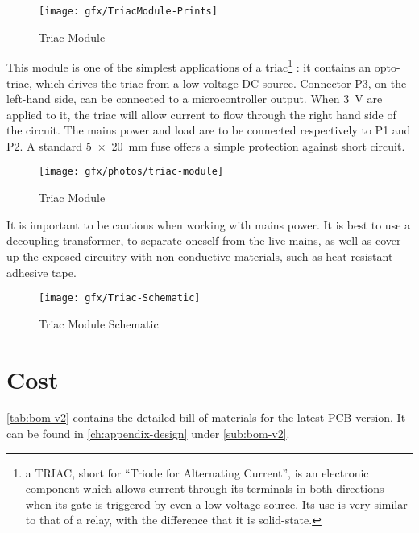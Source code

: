 \begin{figure}[htb]
  \begin{center}
    \texttt{[image: gfx/TriacModule-Prints]}
  \end{center}
  \caption{Triac Module}
  \label{fig:triac-module}
\end{figure}

This module is one of the simplest applications of a triac\footnote{a TRIAC,
short for ``Triode for Alternating Current'', is an electronic component which
allows current through its terminals in both directions when its gate is
triggered by even a low-voltage source. Its use is very similar to that of
a relay, with the difference that it is solid-state.}
: it contains an opto-triac, which drives the triac from a low-voltage DC
source. Connector P3, on the left-hand side, can be connected to
a microcontroller output. When \SI{3}{V} are applied to it, the triac will allow
current to flow through the right hand side of the circuit. The mains power and
load are to be connected respectively to P1 and P2. A standard \SI{5x20}{mm}
fuse offers a simple protection against short circuit.

\begin{figure}[htb]
  \begin{center}
    \texttt{[image: gfx/photos/triac-module]}
  \end{center}
  \caption{Triac Module}
  \label{fig:triac-module-photo}
\end{figure}

It is important to be cautious when working with mains power. It is best to use
a decoupling transformer, to separate oneself from the live mains, as well as
cover up the exposed circuitry with non-conductive materials, such as
heat-resistant adhesive tape.

\begin{figure}[htb]
  \begin{center}
    \texttt{[image: gfx/Triac-Schematic]}
  \end{center}
  \caption{Triac Module Schematic}
  \label{fig:triac-schematic}
\end{figure}

\section{Cost}\label{sec:cost}

\autoref{tab:bom-v2} contains the detailed bill of materials for the latest PCB
version. It can be found in \autoref{ch:appendix-design} under
\autoref{sub:bom-v2}.

